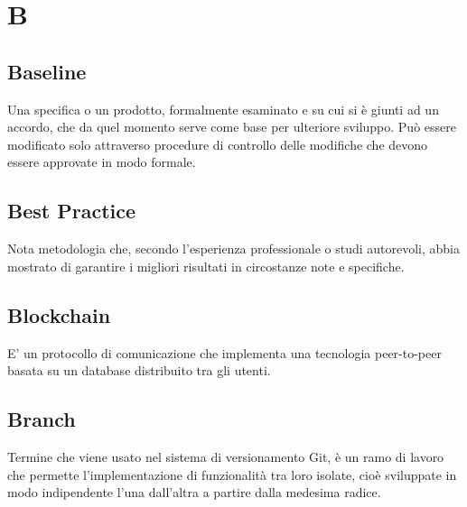 \section*{B}

\subsection{Baseline}
Una specifica o un prodotto, formalmente esaminato e su cui si è giunti ad un accordo, che da quel momento serve come base per ulteriore sviluppo. Può essere modificato solo attraverso procedure di controllo delle modifiche che devono essere approvate in modo formale.

\subsection{Best Practice}
Nota metodologia che, secondo l'esperienza professionale o studi autorevoli, abbia mostrato di garantire i migliori risultati in circostanze note e specifiche.

\subsection{Blockchain}
E' un protocollo di comunicazione che implementa una tecnologia peer-to-peer basata su un database distribuito tra gli utenti.

\subsection{Branch}
Termine che viene usato nel sistema di versionamento Git, è un ramo di lavoro che permette l'implementazione di funzionalità tra loro isolate, cioè sviluppate in modo indipendente l'una dall'altra a partire dalla medesima radice.